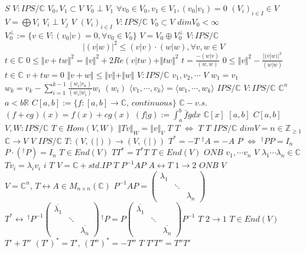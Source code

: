 \documentclass{article}
\begin{document}
$S$
$V:IPS/\mathbb{C}$
$V_0,V_1 \subset V$
$V_0 \perp V_1$
$\forall v_0 \in V_0, v_1 \in V_1, (v_0 \vert v_1)=0$
$(V_i)_{i \in I} \in V$
$V = \bigoplus V_i$
$V_i \perp V_j$
$V$
$(V_i)_{i \in I}$
$V:IPS/\mathbb{C}$
$V_0 \subset V$
$dimV_0<\infty$
$V_0^\perp :=\{v \in V: (v_0 \vert v)=0, \forall v_0 \in V_0 \}$
$V=V_0 \oplus V_0^\perp$
$V:IPS/\mathbb{C}$
$$\vert (v | w) \vert^2  \leq (v | v) \cdot (w|w),\forall v,w \in V$$
$t \in \mathbb{C}$
$0 \leq \Vert v+tw \Vert^2 = \Vert v \Vert^2 + 2Re(v|tw) + \Vert tw \Vert^2$
$t=\frac{-(w|v)}{(w,w)}$
$0 \leq \Vert v \Vert^2 - \frac{|(v|w)|^2}{(w|w)}$
$t \in \mathbb{C}$
$v+tw=0$
$\Vert v+w \Vert \leq \Vert v \Vert + \Vert w \Vert$
$V:IPS/\mathbb{C}$
$v_1,v_2, \cdots$
$V$
$w_1=v_1$
$w_k=v_k-\sum\limits_{i=1}^{k-1} \frac{(w_i|v_k)}{(w_i|w_i)}w_i$
$(w_i)$
$\langle v_1, \cdots, v_k \rangle=\langle w_1, \cdots, w_k \rangle$
$IPS/\mathbb{C}$
$V:IPS/\mathbb{C}$
$\mathbb{C}^n$
$a<b \mathbb{R}$
$C[a,b]:=\{f:[a,b] \rightarrow \mathbb{C},\, continuous\}$
$\mathbb{C}-v.s.$
$(f+cg)(x)=f(x)+cg(x)$
$(f|g):= \int_a^b \bar{f}g dx$
$\mathbb{C}[x]$
$[a,b]$
$C[a,b]$
$V,W:IPS/\mathbb{C}$
$T\in Hom(V,W)$
$\Vert Tv \Vert_W= \Vert v \Vert_V$
$T$
$T$
$\Longleftrightarrow$
$T$
$T$
$IPS/\mathbb{C}$
$dimV=n \in \mathbb{Z}_{\geq1}$
$\mathbb{C} \rightarrow V$
$V$
$IPS/\mathbb{C}$
$T:(V,(|)) \rightarrow (V,(|))$
$T^*=-T$
$^\dagger A=-A$
$P$
$\Longleftrightarrow$
$^\dagger PP=I_n$
$P \cdot (^ \dagger P)=I_n$
$T \in End(V)$
$TT^*=T^*T$
$T \in End(V)$
$ONB$
$v_1, \cdots v_n$
$V$
$\lambda_1 \cdots \lambda_n \in \mathbb{C}$
$Tv_i=\lambda_iv_i$
$i$
$T$
$V=\mathbb{C} + std.IP$
$T$
$P^{-1}AP$
$A \leftrightarrow T$
$1 \rightarrow 2$
$ONB$
$V$
$V=\mathbb{C}^n,\,T \leftrightarrow A\in M_{n\times n}(\mathbb{C})$
$P^{-1}AP=\begin{pmatrix}\lambda_1&&\\&\ddots&\\&&\lambda_n\end{pmatrix}$
$T^* \leftrightarrow \,^\dagger P^{-1}\begin{pmatrix}\overline{\lambda_1}&&\\&\ddots&\\&&\overline{\lambda_n}\end{pmatrix}\,^\dagger P=P\begin{pmatrix}\overline{\lambda_1}&&\\&\ddots&\\&&\overline{\lambda_n}\end{pmatrix}P^{-1}$
$T$
$2 \rightarrow 1$
$T \in End(V)$
$T'+T''$
$(T')^*=T',\,(T'')^*=-T''$
$T$
$T'T''=T''T'$
\end{document}
